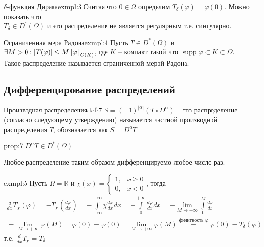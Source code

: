 \documentclass[12pt,a4paper]{article}
\newcommand{\Real}{\mathbb{R}}
\DeclareMathOperator\supp{supp}
\begin{document}
\begin{example}{$\delta$-функция Дирака}{exmpl:3}
	Считая что $0 \in \Omega$ определим $T_\delta (\varphi) = \varphi(0)$. Можно показать что \\ $T_\delta \in D^* (\Omega)$ и это распределение не является регулярным т.е. сингулярно.
\end{example}

\begin{example}{Ограниченная мера Радона}{exmpl:4}
	Пусть $T \in D^* (\Omega)$ и $\exists M > 0: |T(\varphi)| \leq M \norm{\varphi}_{C(K)}$, где $K$ -- компакт такой что $\supp \varphi \subset K \subset \Omega$. Такое распределение называется ограниченной мерой Радона.
\end{example}

\subsection{Дифференцирование распределений}

\begin{definition}{Производная распределения}{def:7}
	$S = (-1)^{|\alpha|} (T \circ D^\alpha)$ -- это распределение (согласно следующему утверждению) называется частной производной распределения $T$, обозначается как $S = D^\alpha T$
\end{definition}

\begin{proposition}{}{prop:7}
	$D^\alpha T \in D^* (\Omega)$
\end{proposition}
Любое распределение таким образом дифференцируемо любое число раз.

\begin{example}{}{exmpl:5}
	Пусть $\Omega = \Real$ и $\chi(x) = 
	\begin{cases}
		1, &x \geq 0 \\
		0, &x < 0
	\end{cases}$, тогда 
	\begin{multline*}
		\frac{d}{dx}T_{\chi} (\varphi) = -T_{\chi}\left(\frac{d\varphi}{dx}\right) = -\int\limits_{-\infty}^{+\infty}{\chi \frac{d\varphi}{dx} dx} = -\int\limits_{0}^{+\infty}{\frac{d\varphi}{dx} dx} = -\lim_{M\to +\infty}{\int\limits_{0}^{M}{\frac{d\varphi}{dx}}} = \\ =\lim_{M\to +\infty}{\varphi(M) - \varphi(0)} = \varphi(0) - \lim_{M\to +\infty}{\varphi(M)} \overset{\text{финитность } \varphi}{=} \varphi(0) = T_\delta (\varphi)
	\end{multline*}
	т.е. $\frac{d}{dx}T_\chi = T_\delta$
\end{example}
\end{document}
